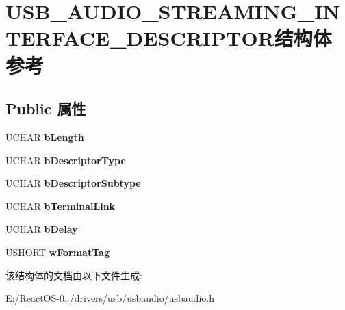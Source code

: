 \hypertarget{struct_u_s_b___a_u_d_i_o___s_t_r_e_a_m_i_n_g___i_n_t_e_r_f_a_c_e___d_e_s_c_r_i_p_t_o_r}{}\section{U\+S\+B\+\_\+\+A\+U\+D\+I\+O\+\_\+\+S\+T\+R\+E\+A\+M\+I\+N\+G\+\_\+\+I\+N\+T\+E\+R\+F\+A\+C\+E\+\_\+\+D\+E\+S\+C\+R\+I\+P\+T\+O\+R结构体 参考}
\label{struct_u_s_b___a_u_d_i_o___s_t_r_e_a_m_i_n_g___i_n_t_e_r_f_a_c_e___d_e_s_c_r_i_p_t_o_r}
\subsection*{Public 属性}
\begin{DoxyCompactItemize}
\item 
\mbox{\label{struct_u_s_b___a_u_d_i_o___s_t_r_e_a_m_i_n_g___i_n_t_e_r_f_a_c_e___d_e_s_c_r_i_p_t_o_r_ad241a55d8fcc1d64938450357c88400f}} 
U\+C\+H\+AR {\bfseries b\+Length}
\item 
\mbox{\label{struct_u_s_b___a_u_d_i_o___s_t_r_e_a_m_i_n_g___i_n_t_e_r_f_a_c_e___d_e_s_c_r_i_p_t_o_r_a78331b6347d23f05c333eccfa35dca93}} 
U\+C\+H\+AR {\bfseries b\+Descriptor\+Type}
\item 
\mbox{\label{struct_u_s_b___a_u_d_i_o___s_t_r_e_a_m_i_n_g___i_n_t_e_r_f_a_c_e___d_e_s_c_r_i_p_t_o_r_af097aa82b9f43903c83e9486c17eb543}} 
U\+C\+H\+AR {\bfseries b\+Descriptor\+Subtype}
\item 
\mbox{\label{struct_u_s_b___a_u_d_i_o___s_t_r_e_a_m_i_n_g___i_n_t_e_r_f_a_c_e___d_e_s_c_r_i_p_t_o_r_a0ad0906fe07bc04a70400439553031d5}} 
U\+C\+H\+AR {\bfseries b\+Terminal\+Link}
\item 
\mbox{\label{struct_u_s_b___a_u_d_i_o___s_t_r_e_a_m_i_n_g___i_n_t_e_r_f_a_c_e___d_e_s_c_r_i_p_t_o_r_a359586d30fe7bc516b1f8e7c2ec8200d}} 
U\+C\+H\+AR {\bfseries b\+Delay}
\item 
\mbox{\label{struct_u_s_b___a_u_d_i_o___s_t_r_e_a_m_i_n_g___i_n_t_e_r_f_a_c_e___d_e_s_c_r_i_p_t_o_r_aa84101b67151e46104c72f4715b196c0}} 
U\+S\+H\+O\+RT {\bfseries w\+Format\+Tag}
\end{DoxyCompactItemize}


该结构体的文档由以下文件生成\+:\begin{DoxyCompactItemize}
\item 
E\+:/\+React\+O\+S-\/0../drivers/usb/usbaudio/usbaudio.\+h\end{DoxyCompactItemize}
